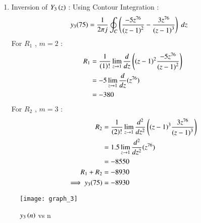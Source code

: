 \documentclass[journal,12pt,onecolumn]{IEEEtran}
\theoremstyle{remark}
\begin{document}
\begin{enumerate}
\begin{enumerate}
    \item
Inversion of $Y_3\left(z\right)$ :
Using Contour Integration :
\begin{align}
    y_3{(75)}&=\frac{1}{2\pi j}\oint_{C}\left(\frac{-5z^{76}}{\left(z-1\right)^2}-
       \frac{3z^{76}}{\left(z-1\right)^3}\right) \;dz 
\end{align}
For $R_1$ , $m=2$ :
\begin{align}
    R_1 &=\frac{1}{\left(1\right)!}\lim\limits_{z\to 1}\frac{d}{dz}\left({(z-1)}^{2}\frac{-5z^{76}}{{(z-1)}^2}\right)   \\
    &=-5\lim\limits_{z\to 1}\frac{d}{dz}(z^{76})   \\
    &= -380
        \end{align}
  For $R_2$ , $m=3$ :
    \begin{align}
    R_2 &=\frac{1}{\left(2\right)!}\lim\limits_{z\to 1}\frac{d^{2}}{dz^{2}}\left({(z-1)}^{3}\frac{3z^{76}}{{(z-1)}^3}\right)   \\
    &=1.5\lim\limits_{z\to 1}\frac{d^2}{dz^2}(z^{76})   \\
    &= -8550\\
    R_1 + R_2 &= -8930\\
    \implies  y_3{(75)} &= -8930
\end{align}
    \end{enumerate}



\begin{figure}[h!]   
\centering
    \graphicspath{ {figs/} }
    \texttt{[image: graph\_3]}
    \caption{$y_3\left(n\right)$ vs n }
    \label{graph:ee25-g4}
\end{figure}
 \end{enumerate}
\end{document}
